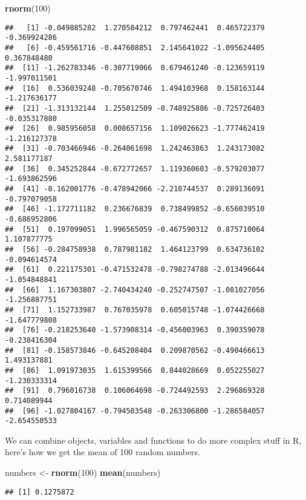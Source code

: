 \documentclass[
]{book}
\newenvironment{Shaded}{\begin{snugshade}}{\end{snugshade}}
\newcommand{\DecValTok}[1]{\textcolor[rgb]{0.00,0.00,0.81}{#1}}
\newcommand{\KeywordTok}[1]{\textcolor[rgb]{0.13,0.29,0.53}{\textbf{#1}}}
\newcommand{\NormalTok}[1]{#1}
\newcommand{\StringTok}[1]{\textcolor[rgb]{0.31,0.60,0.02}{#1}}
\begin{document}
\begin{Shaded}
\begin{Highlighting}[]
\KeywordTok{rnorm}\NormalTok{(}\DecValTok{100}\NormalTok{)}
\end{Highlighting}
\end{Shaded}

\begin{verbatim}
##   [1] -0.049885282  1.270584212  0.797462441  0.465722379 -0.369924286
##   [6] -0.459561716 -0.447608851  2.145641022 -1.095624405  0.367848480
##  [11] -1.262783346 -0.307719066  0.679461240 -0.123659119 -1.997011501
##  [16]  0.536039248 -0.705670746  1.494103968  0.158163144 -1.217636177
##  [21] -1.313132144  1.255012509 -0.748925886 -0.725726403 -0.035317880
##  [26]  0.985956058  0.008657156  1.109026623 -1.777462419 -1.216127378
##  [31] -0.703466946 -0.264061698  1.242463863  1.243173082  2.581177187
##  [36]  0.345252844 -0.672772657  1.119360603 -0.579203077 -1.693862596
##  [41] -0.162001776 -0.478942066 -2.210744537  0.289136091 -0.797079058
##  [46] -1.172711182  0.236676839  0.738499852 -0.656039510 -0.686952806
##  [51]  0.197099051  1.996565059 -0.467590312  0.875710064  1.107877775
##  [56] -0.284758938  0.787981182  1.464123799  0.634736102 -0.094614574
##  [61]  0.221175301 -0.471532478 -0.798274788 -2.013496644 -1.054848841
##  [66]  1.167303807 -2.740434240 -0.252747507 -1.081027056 -1.256887751
##  [71]  1.152733987  0.767035978  0.605015748 -1.074426668 -1.647779808
##  [76] -0.218253640 -1.573908314 -0.456003963  0.390359078 -0.238416304
##  [81] -0.158573846 -0.645208404  0.209870562 -0.490466613  1.493137881
##  [86]  1.091973035  1.615399566  0.844028669  0.052255027 -1.230333314
##  [91]  0.796016738  0.106064698 -0.724492593  2.296869328  0.714089944
##  [96] -1.027804167 -0.794503548 -0.263306800 -1.286584057 -2.654550533
\end{verbatim}

We can combine objects, variables and functions to do more complex stuff in R, here's how we get the mean of 100 random numbers.

\begin{Shaded}
\begin{Highlighting}[]
\NormalTok{numbers <-}\StringTok{ }\KeywordTok{rnorm}\NormalTok{(}\DecValTok{100}\NormalTok{)}
\KeywordTok{mean}\NormalTok{(numbers)}
\end{Highlighting}
\end{Shaded}

\begin{verbatim}
## [1] 0.1275872
\end{verbatim}
\end{document}
